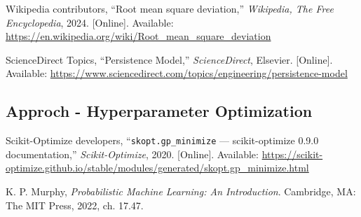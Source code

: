 \documentclass[11pt]{article}
\begin{document}

\begin{thebibliography}{99}

Wikipedia contributors, “Root mean square deviation,” \textit{Wikipedia, The Free Encyclopedia}, 2024. [Online]. Available: \url{https://en.wikipedia.org/wiki/Root_mean_square_deviation}

ScienceDirect Topics, “Persistence Model,” \textit{ScienceDirect}, Elsevier. [Online]. Available: \url{https://www.sciencedirect.com/topics/engineering/persistence-model}

\subsection*{Approch - Hyperparameter Optimization}

Scikit-Optimize developers, “\texttt{skopt.gp\_minimize} — scikit-optimize 0.9.0 documentation,” \textit{Scikit-Optimize}, 2020. [Online]. Available: \url{https://scikit-optimize.github.io/stable/modules/generated/skopt.gp_minimize.html}

K. P. Murphy, \textit{Probabilistic Machine Learning: An Introduction}. Cambridge, MA: The MIT Press, 2022, ch. 17.47.

\end{thebibliography}
\end{document}
